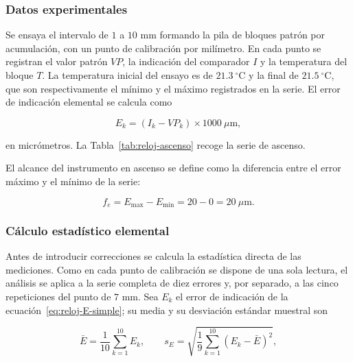 \subsubsection{Datos experimentales}
\label{sec:reloj-datos}

Se ensaya el intervalo de $1$ a $10$ mm formando la pila de bloques patrón por
acumulación, con un punto de calibración por milímetro. En cada punto se registran el
valor patrón $VP$, la indicación del comparador $I$ y la temperatura del bloque $T$. La
temperatura inicial del ensayo es de $21.3\ ^\circ\text{C}$ y la final de
$21.5\ ^\circ\text{C}$, que son respectivamente el mínimo y el máximo registrados en la
serie. El error de indicación elemental se calcula como

\begin{equation}
    E_k = (I_k - VP_k)\times 1000\ \mu\text{m},
    \label{eq:reloj-E-simple}
\end{equation}

en micrómetros. La Tabla~\ref{tab:reloj-ascenso} recoge la serie de ascenso.



El alcance del instrumento en ascenso se define como la diferencia entre el error
máximo y el mínimo de la serie:

\begin{equation}
    f_e = E_{\max} - E_{\min} = 20 - 0 = 20\ \mu\text{m}.
    \label{eq:reloj-fe}
\end{equation}

\subsubsection{Cálculo estadístico elemental}
\label{sec:reloj-estadistica}

Antes de introducir correcciones se calcula la estadística directa de las mediciones.
Como en cada punto de calibración se dispone de una sola lectura, el análisis se aplica
a la serie completa de diez errores y, por separado, a las cinco repeticiones del punto
de $7$ mm. Sea $E_k$ el error de indicación de la
ecuación~\eqref{eq:reloj-E-simple}; su media y su desviación estándar muestral son

\begin{equation}
  \bar E = \frac{1}{10}\sum_{k=1}^{10} E_k,
  \qquad
  s_E = \sqrt{\frac{1}{9}\sum_{k=1}^{10}\left(E_k - \bar E\right)^2},
  \label{eq:reloj-estadistica-serie}
\end{equation}

